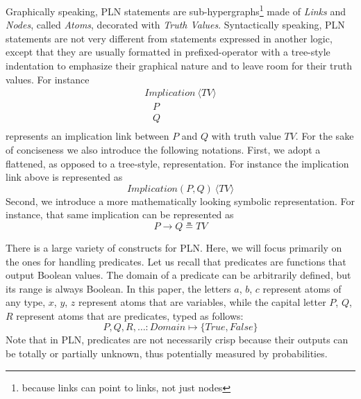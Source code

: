 \documentclass[runningheads]{llncs}
\newcommand{\SP}{\;\;\;}
\newcommand{\TTrue}{\textit{True}}
\newcommand{\TFalse}{\textit{False}}
\newcommand{\TAtom}{\textit{Atom}}
\newcommand{\TImpl}{\textit{Implication}}
\newcommand{\TTV}{\textit{TV}}
\newcommand{\TBTV}{\langle \TTV \rangle}
\newcommand{\limp}{\rightarrow}
\begin{document}
Graphically speaking, PLN statements are
sub-hypergraphs\footnote{because links can point to links, not just
  nodes} made of \emph{Links} and \emph{Nodes}, called \emph{Atoms},
decorated with \emph{Truth Values}.  Syntactically speaking, PLN
statements are not very different from statements expressed in another
logic, except that they are usually formatted in prefixed-operator
with a tree-style indentation to emphasize their graphical nature and
to leave room for their truth values.  For instance
$$
\begin{array}{l}
  \TImpl\ \TBTV\\
  \SP P\\
  \SP Q\\
\end{array}
$$
represents an implication link between $P$ and $Q$ with truth value
$\TTV$.  For the sake of conciseness we also introduce the following
notations.  First, we adopt a flattened, as opposed to a tree-style,
representation.  For instance the implication link above is
represented as
$$\TImpl(P, Q)\ \TBTV$$
Second, we introduce a more mathematically looking symbolic
representation.  For instance, that same implication can be
represented as
$$P \limp Q \measeq \TTV$$

There is a large variety of constructs for PLN.  Here, we will focus
primarily on the ones for handling predicates.  Let us recall that
predicates are functions that output Boolean values.  The domain of a
predicate can be arbitrarily defined, but its range is always Boolean.
In this paper, the letters $a$, $b$, $c$ represent atoms of
any type, $x$, $y$, $z$ represent atoms that are variables, while the
capital letter $P$, $Q$, $R$ represent atoms that are predicates,
typed as follows:
$$P, Q, R, \hdots: \textit{Domain} \mapsto \{\TTrue, \TFalse\}$$
Note that in PLN, predicates are not necessarily crisp because their
outputs can be totally or partially unknown, thus potentially measured
by probabilities.
\end{document}
